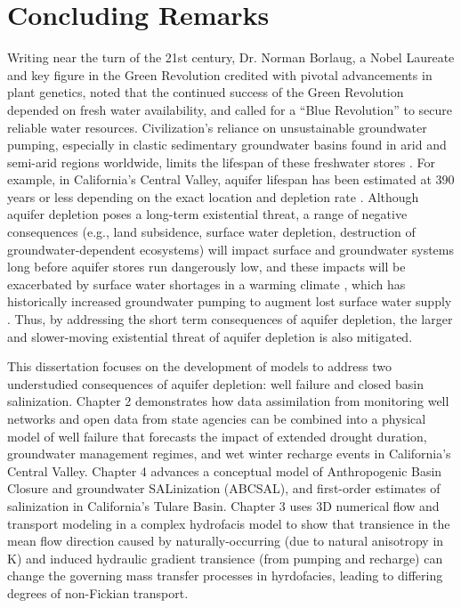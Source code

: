 \chapter[Concluding Remarks.]{Concluding Remarks}

Writing near the turn of the 21st century, Dr. Norman Borlaug, a Nobel Laureate and key figure in the Green Revolution credited with pivotal advancements in plant genetics, noted that the continued success of the Green Revolution depended on fresh water availability, and called for a ``Blue Revolution'' to secure reliable water resources. Civilization's reliance on unsustainable groundwater pumping, especially in clastic sedimentary groundwater basins found in arid and semi-arid regions worldwide, limits the lifespan of these freshwater stores \citep{Scanlon2012, wada2010global, Gleeson2012}. For example, in California's Central Valley, aquifer lifespan has been estimated at 390 years or less depending on the exact location and depletion rate \citep{Scanlon2012}. Although aquifer depletion poses a long-term existential threat, a range of negative consequences (e.g., land subsidence, surface water depletion, destruction of groundwater-dependent ecosystems) will impact surface and groundwater systems long before aquifer stores run dangerously low, and these impacts will be exacerbated by surface water shortages in a warming climate \citep{Rhoades2018, Swain2018, Cook2015}, which has historically increased groundwater pumping to augment lost surface water supply \citep{Hanak2011, Medellin-azuara2016}. Thus, by addressing the short term consequences of aquifer depletion, the larger and slower-moving existential threat of aquifer depletion is also mitigated. 

This dissertation focuses on the development of models to address two understudied consequences of aquifer depletion: well failure and closed basin salinization. Chapter 2 demonstrates how data assimilation from monitoring well networks and open data from state agencies can be combined into a physical model of well failure that forecasts the impact of extended drought duration, groundwater management regimes, and wet winter recharge events in California's Central Valley. Chapter 4 advances a conceptual model of Anthropogenic Basin Closure and groundwater SALinization (ABCSAL), and first-order estimates of salinization in California's Tulare Basin. Chapter 3 uses 3D numerical flow and transport modeling in a complex hydrofacis model to show that transience in the mean flow direction caused by naturally-occurring (due to natural anisotropy in K) and induced hydraulic gradient transience (from pumping and recharge) can change the governing mass transfer processes in hyrdofacies, leading to differing degrees of non-Fickian transport. 


